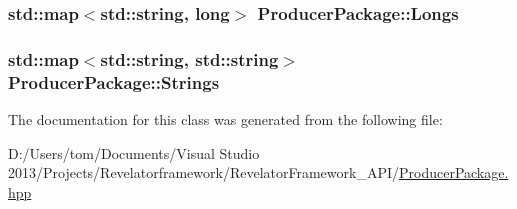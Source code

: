 \hypertarget{class_producer_package_a40a935d0c8cf30f70c30491ca063c750}{
\subsubsection[{Longs}]{\setlength{\rightskip}{0pt plus 5cm}std\-::map$<$std\-::string, long$>$ Producer\-Package\-::\-Longs\hspace{0.3cm}{\ttfamily [private]}}}\label{class_producer_package_a40a935d0c8cf30f70c30491ca063c750}
\hypertarget{class_producer_package_aaff12a94ce8d3659e6258d03d6a6121a}{
\subsubsection[{Strings}]{\setlength{\rightskip}{0pt plus 5cm}std\-::map$<$std\-::string, std\-::string$>$ Producer\-Package\-::\-Strings\hspace{0.3cm}{\ttfamily [private]}}}\label{class_producer_package_aaff12a94ce8d3659e6258d03d6a6121a}


The documentation for this class was generated from the following file\-:\begin{DoxyCompactItemize}
\item 
D\-:/\-Users/tom/\-Documents/\-Visual Studio 2013/\-Projects/\-Revelatorframework/\-Revelator\-Framework\-\_\-\-A\-P\-I/\hyperlink{_producer_package_8hpp}{Producer\-Package.\-hpp}\end{DoxyCompactItemize}
